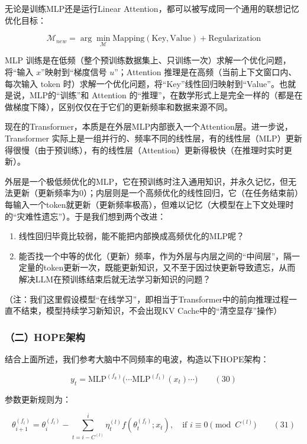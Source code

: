 无论是训练MLP还是运行Linear Attention，都可以被写成同一个通用的联想记忆优化目标：

\[
\mathcal{M}_{new}
=
\arg\min_{\mathcal{M}}
\mathrm{Mapping}(\mathrm{Key}, \mathrm{Value})
 + \mathrm{Regularization}
\]

MLP 训练是在低频（整个预训练数据集上、只训练一次）求解一个优化问题，将``输入 \(x\)''映射到``梯度信号 \(u\)''；Attention 推理是在高频（当前上下文窗口内、每次输入 token 时）求解一个优化问题，将``Key''线性回归映射到``Value''。也就是说，MLP的``训练''和 Attention 的``推理''，在数学形式上是完全一样的（都是在做梯度下降），区别仅仅在于它们的更新频率和数据来源不同。

现在的Transformer，本质是在外层MLP内部嵌入一个Attention层。进一步说，Transformer 实际上是一组并行的、频率不同的线性层，有的线性层（MLP）更新得很慢（由于预训练），有的线性层（Attention）更新得极快（在推理时实时更新）。

外层是一个极低频优化的MLP，它在预训练时注入通用知识，并永久记忆，但无法更新（更新频率为0）；内层则是一个高频优化的线性回归，它（在任务结束前）每输入一个token就更新（更新频率极高），但难以记忆（大模型在上下文处理时的``灾难性遗忘''）。于是我们想到两个改进：

\begin{enumerate}
\def\labelenumi{\arabic{enumi}.}
\item
  线性回归毕竟比较弱，能不能把内部换成高频优化的MLP呢？
\item
  能否找一个中等的优化（更新）频率，作为外层与内层之间的``中间层''，隔一定量的token更新一次，既能更新知识，又不至于因过快更新导致遗忘，从而解决LLM在预训练结束后就无法学习新知识的问题？
\end{enumerate}

（注：我们这里假设模型``在线学习''，即相当于Transformer中的前向推理过程一直不结束，模型持续学习新知识，不会出现KV Cache中的``清空显存''操作）

\hypertarget{ux4e8chopeux67b6ux6784}{%
\subsubsection{（二）HOPE架构}\label{ux4e8chopeux67b6ux6784}}

结合上面所述，我们参考大脑中不同频率的电波，构造以下HOPE架构：

\[
y_t =
\mathrm{MLP}^{(f_k)}
\bigl(
\cdots
\mathrm{MLP}^{(f_1)}(x_t)
\cdots
\bigr)
\qquad (30)
\]

参数更新规则为：

\[
\theta^{(f_l)}_{i+1}
=
\theta^{(f_l)}_{i}
-
\sum_{t=i-C^{(l)}}^{i}
\eta_t^{(l)}
f\!\left(\theta_t^{(f_l)};x_t\right),
\quad
\text{if } i\equiv 0\pmod{C^{(l)}}
\qquad (31)
\]

